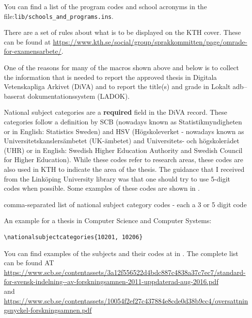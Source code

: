 \documentclass[examplethesis.tex]{subfiles}
\begin{document}
You can find a list of the program codes and school acronyms in the file:\linebreak[4] \texttt{lib/schools\_and\_programs.ins}.

There are a set of rules about what is to be displayed on the KTH cover. These can be found at \url{https://www.kth.se/social/group/sprakkommitten/page/omrade-for-examensarbete/}.

One of the reasons for many of the macros shown above and below is to collect the information that is needed to report the approved thesis in Digitala Vetenskapliga Arkivet (DiVA) and to report the title(s) and grade in \foreignlanguage{swedish}{Lokalt adb–baserat dokumentationssystem (LADOK)}.

National subject categories are a \textbf{required} field in the DiVA record. These categories follow a definition by \foreignlanguage{swedish}{SCB} (nowadays known as \foreignlanguage{swedish}{Statistikmyndigheten} or in English: Statistics Sweden) and HSV (\foreignlanguage{swedish}{Högskoleverket} - nowadays known as  \foreignlanguage{swedish}{Universitetskanslersämbetet (UK-ämbetet)} and \foreignlanguage{swedish}{Universitets- och högskolerådet (UHR)} or in English: Swedish Higher Education Authority and Swedish Council for Higher Education).
While these codes refer to research areas, these codes are also used in KTH to indicate the area of the thesis. The guidance that I received from the Linköping University library was that one should try to use 5-digit codes when possible. Some examples of these codes are shown in
.
\begin{description}[leftmargin=!, labelwidth =\widthof{\texttt{\textbackslash nationalsubjectcategories\{\}}}]
\item [\texttt{\textbackslash nationalsubjectcategories\{\}}] comma-separated list of national subject category codes - each a 3 or 5 digit code
\end{description}

An example for a thesis in Computer Science and Computer Systems:
\begin{lstlisting}[style=latexExampleForAuthors]
\nationalsubjectcategories{10201, 10206}
\end{lstlisting}

You can find examples of the subjects and their codes at in . The complete list can be found AT \url{https://www.scb.se/contentassets/3a12f556522d4bdc887c4838a37c7ec7/standard-for-svensk-indelning--av-forskningsamnen-2011-uppdaterad-aug-2016.pdf}\\
and\\
\url{https://www.scb.se/contentassets/10054f2ef27c437884e8cde0d38b9cc4/oversattningsnyckel-forskningsamnen.pdf}
\end{document}
